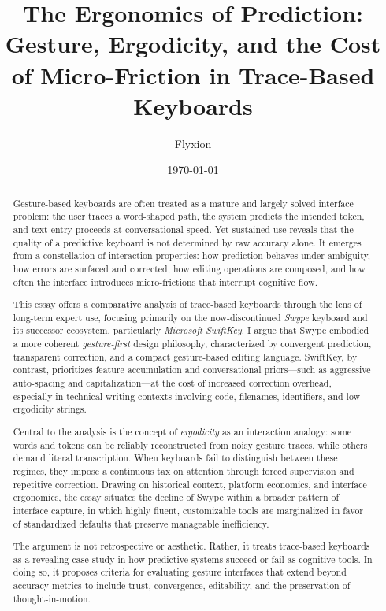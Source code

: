 \documentclass[11pt]{article}
\title{The Ergonomics of Prediction:\\
Gesture, Ergodicity, and the Cost of Micro-Friction in Trace-Based Keyboards}
\author{Flyxion}
\date{\today}
\begin{document}
\maketitle

\begin{abstract}
Gesture-based keyboards are often treated as a mature and largely solved interface problem: the user traces a word-shaped path, the system predicts the intended token, and text entry proceeds at conversational speed. Yet sustained use reveals that the quality of a predictive keyboard is not determined by raw accuracy alone. It emerges from a constellation of interaction properties: how prediction behaves under ambiguity, how errors are surfaced and corrected, how editing operations are composed, and how often the interface introduces micro-frictions that interrupt cognitive flow.

This essay offers a comparative analysis of trace-based keyboards through the lens of long-term expert use, focusing primarily on the now-discontinued \textit{Swype} keyboard and its successor ecosystem, particularly \textit{Microsoft SwiftKey}. I argue that Swype embodied a more coherent \emph{gesture-first} design philosophy, characterized by convergent prediction, transparent correction, and a compact gesture-based editing language. SwiftKey, by contrast, prioritizes feature accumulation and conversational priors—such as aggressive auto-spacing and capitalization—at the cost of increased correction overhead, especially in technical writing contexts involving code, filenames, identifiers, and low-ergodicity strings.

Central to the analysis is the concept of \emph{ergodicity} as an interaction analogy: some words and tokens can be reliably reconstructed from noisy gesture traces, while others demand literal transcription. When keyboards fail to distinguish between these regimes, they impose a continuous tax on attention through forced supervision and repetitive correction. Drawing on historical context, platform economics, and interface ergonomics, the essay situates the decline of Swype within a broader pattern of interface capture, in which highly fluent, customizable tools are marginalized in favor of standardized defaults that preserve manageable inefficiency.

The argument is not retrospective or aesthetic. Rather, it treats trace-based keyboards as a revealing case study in how predictive systems succeed or fail as cognitive tools. In doing so, it proposes criteria for evaluating gesture interfaces that extend beyond accuracy metrics to include trust, convergence, editability, and the preservation of thought-in-motion.
\end{abstract}
\end{document}
